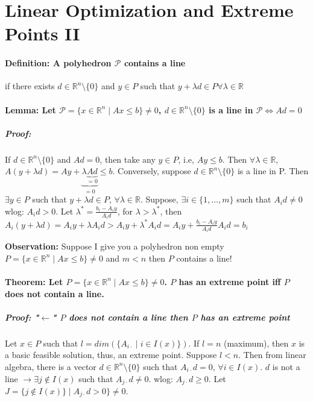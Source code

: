 \documentclass[main]{subfiles}
\begin{document}

\section{Linear Optimization and Extreme Points II}

\paragraph{Definition: A polyhedron $\mathcal{P}$ contains a line} if there
exists $d \in \mathbb{R}^{n}\setminus\{0\}$ and $y \in P$ such that
$y + \lambda d \in P \forall \lambda \in \mathbb{R}$

\paragraph{Lemma: Let $\mathcal{P} = \{ x \in \mathbb{R}^{n} \mid Ax \leq b \}
\neq 0$, $d \in \mathbb{R}^{n}\setminus \{0\}$ is a line in $\mathcal{P}
\iff Ad = 0$ }

\subparagraph{Proof:}

If $d \in \mathbb{R}^{n}\setminus \{0\}$ and $Ad=0$, then take any $y \in P$,
i.e, $Ay \leq b$. Then $\forall \lambda \in \mathbb{R}$, $A(y+\lambda d) = Ay +
\underbrace{\lambda \underbrace{Ad}_{=0}}_{=0} \leq b$.
Conversely, suppose $d \in \mathbb{R}^{n}\setminus \{0\}$ is a line in P. Then
$\exists y \in P$ such that $y + \lambda d \in P$, $\forall \lambda \in
\mathbb{R}$.
Suppose, $\exists i \in \{1, \dots, m \}$ such that $A_{i}d \neq 0$ wlog:
$A_{i}d > 0$. Let $\lambda^{*} = \frac{b_{i} - A_{i}y}{A_{i}d}$, for $\lambda >
\lambda^{*}$, then $A_{i}(y + \lambda d) = A_{i}y + \lambda A_{i}d > A_{i}y +
\lambda^{*}A_{i}d = A_{i}y + \frac{b_{i} - A_{i}y}{A_{i}d} A_{i}d = b_{i}$

\textbf{Observation:} Suppose I give you a polyhedron non empty $P = \{x \in
\mathbb{R}^{n} \mid Ax \leq b\} \neq 0$ and $m < n$ then $P$ contains a line!

\paragraph{Theorem: Let $P = \{x \in \mathbb{R}^{n} \mid Ax \leq b\} \neq 0$.
$P$ has an extreme point iff $P$ does not contain a line.}

\subparagraph{Proof: "$\leftarrow$" $P$ does not contain a line then $P$ has an
extreme point}
Let $x \in P$ such that $l = dim(\{A_{i\cdot} \mid i \in I(x)\})$. If $l = n$
(maximum), then $x$ is a basic feasible solution, thus, an extreme point.
Suppose $l < n$. Then from linear algebra, there is a vector $ d \in
\mathbb{R}^{n}\setminus\{0\}$ such that $A_{i\cdot}d = 0$, $\forall i \in
I(x)$. $d$ is not a line $\rightarrow \exists j \notin I(x)$ such that
$A_{j\cdot}d \neq 0$. wlog: $A_{j\cdot}d \geq 0$. Let $J = \{j \notin I(x)\}
\mid A_{j\cdot}d > 0\} \neq 0$.
\end{document}
